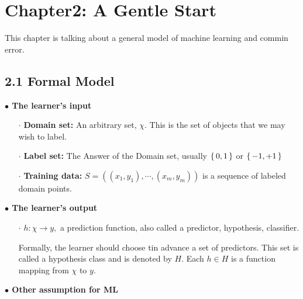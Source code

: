 


\cfoot{\thepage} %

\section*{Chapter2: A Gentle Start}
This chapter is talking about a general model of machine learning and commin error.

\subsection*{2.1 Formal Model} $ $\\

\textbf{$\bullet$ The learner's input}
	\begin{enumerate}
		\item[$\cdot$] \textbf{Domain set:} An arbitrary set, $\chi$. This is the set of objects that we may wish to label.
		\item[$\cdot$] \textbf{Label set:} The Answer of the Domain set, usually $\left\{ \,0,1 \,\right\}$ or $\left\{ \,-1,+1 \,\right\}$
		\item[$\cdot$] \textbf{Training data:} $S = ((x_1,y_1),\cdots,(x_m,y_m))$ is a sequence of labeled domain points.
	\end{enumerate}


\textbf{$\bullet$ The learner's output}
\begin{enumerate}
	\item[$\cdot$] $h:\chi \rightarrow y,$ a prediction function, also called a predictor, hypothesis, classifier.
	
	Formally, the learner should choose tin advance a set of predictors. This set is called a hypothesis class and is denoted by $H$. Each $h \in H$ is a function mapping from $\chi$ to $y$.
\end{enumerate}


\textbf{$\bullet$ Other assumption for ML}

